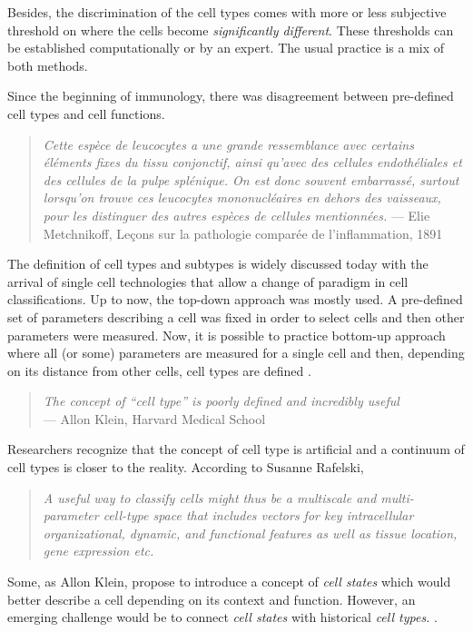 \documentclass[12pt,]{book}
\theoremstyle{definition}
\theoremstyle{definition}
\theoremstyle{definition}
\theoremstyle{remark}
\begin{document}
Besides, the discrimination of the cell types comes with more or less
subjective threshold on where the cells become \emph{significantly
different}. These thresholds can be established computationally or by an
expert. The usual practice is a mix of both methods.

Since the beginning of immunology, there was disagreement between
pre-defined cell types and cell functions.

\begin{quote}
\emph{Cette espèce de leucocytes a une grande ressemblance avec certains
éléments fixes du tissu conjonctif, ainsi qu'avec des cellules
endothéliales et des cellules de la pulpe splénique. On est donc souvent
embarrassé, surtout lorsqu'on trouve ces leucocytes mononucléaires en
dehors des vaisseaux, pour les distinguer des autres espèces de cellules
mentionnées.} --- Elie Metchnikoff, Leçons sur la pathologie comparée de
l'inflammation, 1891
\end{quote}

The definition of cell types and subtypes is widely discussed today with
the arrival of single cell technologies that allow a change of paradigm
in cell classifications. Up to now, the top-down approach was mostly
used. A pre-defined set of parameters describing a cell was fixed in
order to select cells and then other parameters were measured. Now, it
is possible to practice bottom-up approach where all (or some)
parameters are measured for a single cell and then, depending on its
distance from other cells, cell types are defined \citep{Satija2014}.

\begin{quote}
\emph{The concept of ``cell type'' is poorly defined and incredibly
useful}\\
--- Allon Klein, Harvard Medical School
\end{quote}

Researchers recognize that the concept of cell type is artificial and a
continuum of cell types is closer to the reality. According to Susanne
Rafelski,

\begin{quote}
\emph{A useful way to classify cells might thus be a multiscale and
multi-parameter cell-type space that includes vectors for key
intracellular organizational, dynamic, and functional features as well
as tissue location, gene expression etc.}
\end{quote}

Some, as Allon Klein, propose to introduce a concept of \emph{cell
states} which would better describe a cell depending on its context and
function. However, an emerging challenge would be to connect \emph{cell
states} with historical \emph{cell types.}
\citep{EdiorialCellSystems2017} .
\end{document}
